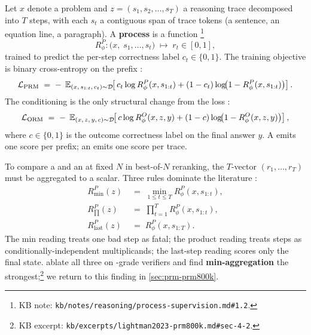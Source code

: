 Let $x$ denote a problem and $z = (s_1, s_2, \ldots, s_T)$ a reasoning
trace decomposed into $T$ steps, with each $s_t$ a contiguous span of
trace tokens (a sentence, an equation line, a paragraph). A
\textbf{process } is a function%
\footnote{KB note: \texttt{kb/notes/reasoning/process-supervision.md\#1.2}.}
\begin{equation}
  R^P_\phi : \bigl(x,\; s_1, \ldots, s_t\bigr) \;\longmapsto\; r_t \in [0, 1],
  \label{eq:prm-signature}
\end{equation}
trained to predict the per-step correctness label $c_t \in \{0, 1\}$.
The training objective is binary cross-entropy on the prefix
\citep[\S 2.2]{lightman2023-prm800k}:
\begin{equation}
  \mathcal{L}_\text{PRM} \;=\; -\;\operatorname{\mathbb{E}}_{(x,\, s_{1:t},\, c_t) \sim \mathcal{D}}\!\!\left[\, c_t \log R^P_\phi(x, s_{1:t}) + (1 - c_t)\log\!\bigl(1 - R^P_\phi(x, s_{1:t})\bigr)\right].
  \label{eq:prm-loss}
\end{equation}
The conditioning is the only structural change from the  loss
\citep[\S 2.1]{lightman2023-prm800k}:
\begin{equation}
  \mathcal{L}_\text{ORM} \;=\; -\;\operatorname{\mathbb{E}}_{(x,\, z,\, y,\, c) \sim \mathcal{D}}\!\!\left[\, c \log R^O_\phi(x, z, y) + (1 - c)\log\!\bigl(1 - R^O_\phi(x, z, y)\bigr)\right],
  \label{eq:orm-loss}
\end{equation}
where $c \in \{0,1\}$ is the outcome correctness label on the final
answer $y$. A  emits one score per prefix; an  emits one score
per trace.

To compare a  and an  at fixed $N$ in best-of-$N$ reranking, the
$T$-vector $(r_1, \ldots, r_T)$ must be aggregated to a scalar.
Three rules dominate the literature
\citep[\S 3.1]{lightman2023-prm800k}:
\begin{align}
  R^P_{\min}(z)  \;&=\; \min_{1 \le t \le T} R^P_\phi(x, s_{1:t}), \label{eq:prm-min} \\
  R^P_{\prod}(z) \;&=\; \prod_{t=1}^{T} R^P_\phi(x, s_{1:t}), \label{eq:prm-prod} \\
  R^P_{\text{last}}(z) \;&=\; R^P_\phi(x, s_{1:T}). \label{eq:prm-last}
\end{align}
The min reading treats one bad step as fatal; the product reading
treats steps as conditionally-independent multiplicands; the last-step
reading scores only the final state. \citet[\S 4.2]{lightman2023-prm800k}
ablate all three on -grade verifiers and find
\textbf{min-aggregation} the strongest;\footnote{KB excerpt:
\texttt{kb/excerpts/lightman2023-prm800k.md\#sec-4-2}.} we return to
this finding in \cref{sec:prm-prm800k}.

